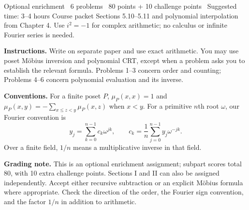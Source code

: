 
\newcommand{\setname}{Problem Set 4}

{Optional enrichment \textbar\ 6 problems \textbar\ 80 points + 10 challenge points
\textbar\ Suggested time: 3--4 hours}
{Course packet Sections 5.10--5.11 and polynomial interpolation from Chapter 4.
Use $i^2=-1$ for complex arithmetic; no calculus or infinite Fourier series is needed.}

\textbf{Instructions.} Write on separate paper and use exact arithmetic.
You may use poset M\"obius inversion and polynomial CRT, except when a
problem asks you to establish the relevant formula. Problems 1--3 concern
order and counting; Problems 4--6 concern polynomial evaluation and its inverse.

\textbf{Conventions.} For a finite poset $P$, $\mu_P(x,x)=1$ and
$\mu_P(x,y)=-\sum_{x\le z<y}\mu_P(x,z)$ when $x<y$.
For a primitive $n$th root $\omega$, our Fourier convention is
\[
 y_j=\sum_{k=0}^{n-1}c_k\omega^{jk},\qquad
 c_k=\frac1n\sum_{j=0}^{n-1}y_j\omega^{-jk}.
\]
Over a finite field, $1/n$ means a multiplicative inverse in that field.

\ifsolutions
\textbf{Grading note.} This is an optional enrichment assignment; subpart
scores total 80, with 10 extra challenge points. Sections I and II can also
be assigned independently. Accept either recursive subtraction or an
explicit M\"obius formula where appropriate. Check the direction of the order,
the Fourier sign convention, and the factor $1/n$ in addition to arithmetic.
\fi


